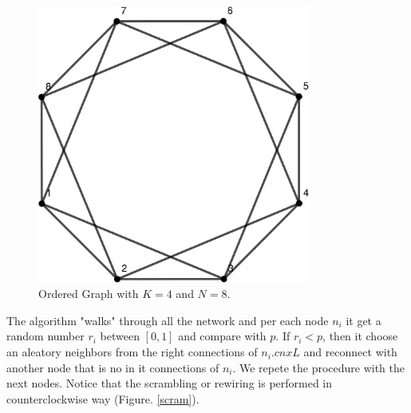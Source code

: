 \documentclass{article}
\begin{document}
\begin{figure}[H]
    \centering
    \includegraphics[width=0.8\textwidth]{ordered.eps}
    \caption{Ordered Graph with $K=4$ and $N=8$.}
    \label{ord}
\end{figure}

The algorithm "walks" through all the network and per each node $n_i$ it get a random number $r_i$ between $[0,1]$ and compare with $p$. If $r_i < p$, then it choose an aleatory neighbors from the right connections of $n_i.cnxL$ and reconnect with another node that is no in it connections of $n_i$. We repete the procedure with the next nodes. Notice that the scrambling or rewiring is performed in counterclockwise way (Figure. \ref{scram}).
\end{document}
